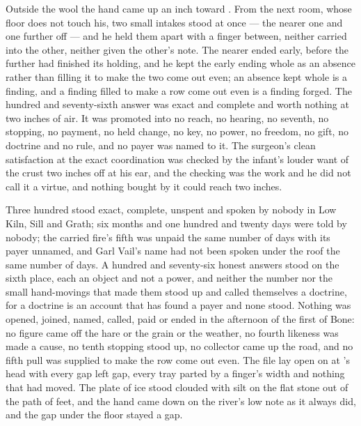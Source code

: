 Outside the wool the hand came up an inch toward . From the next room, whose floor does not touch his, two small intakes stood at once --- the nearer one and one further off --- and he held them apart with a finger between, neither carried into the other, neither given the other's note. The nearer ended early, before the further had finished its holding, and he kept the early ending whole as an absence rather than filling it to make the two come out even; an absence kept whole is a finding, and a finding filled to make a row come out even is a finding forged. The hundred and seventy-sixth answer was exact and complete and worth nothing at two inches of air. It was promoted into no reach, no hearing, no seventh, no stopping, no payment, no held change, no key, no power, no freedom, no gift, no doctrine and no rule, and no payer was named to it. The surgeon's clean satisfaction at the exact coordination was checked by the infant's louder want of the crust two inches off at his ear, and the checking was the work and he did not call it a virtue, and nothing bought by it could reach two inches.

Three hundred stood exact, complete, unspent and spoken by nobody in Low Kiln, Sill and Grath; six months and one hundred and twenty days were told by nobody; the carried fire's fifth was unpaid the same number of days with its payer unnamed, and Garl Vail's name had not been spoken under the roof the same number of days. A hundred and seventy-six honest answers stood on the sixth place, each an object and not a power, and neither the number nor the small hand-movings that made them stood up and called themselves a doctrine, for a doctrine is an account that has found a payer and none stood. Nothing was opened, joined, named, called, paid or ended in the afternoon of the first of Bone: no figure came off the hare or the grain or the weather, no fourth likeness was made a cause, no tenth stopping stood up, no collector came up the road, and no fifth pull was supplied to make the row come out even. The file lay open on  at 's head with every gap left gap, every tray parted by a finger's width and nothing that had moved. The plate of ice stood clouded with silt on the flat stone out of the path of feet, and the hand came down on the river's low note as it always did, and the gap under the floor stayed a gap.

